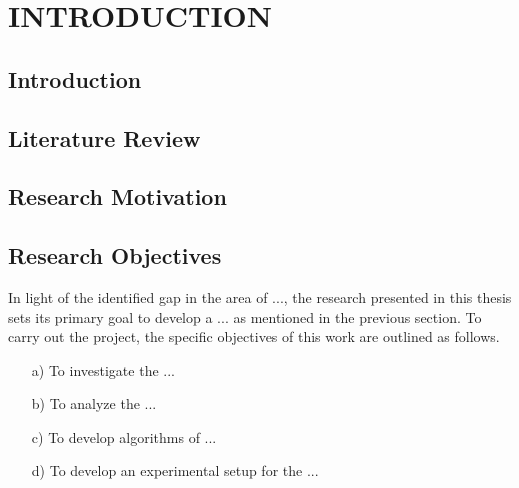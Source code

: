 \chapter{INTRODUCTION}
\label{chap1:intro}



\section{Introduction}
\label{chap1:intro-of-intro}



\section{Literature Review}
\label{sec:literature-review}


\section{Research Motivation}
\label{sec:research-motivation}




\section{Research Objectives}
\label{sec:research-objectives}
In light of the identified gap in the area of ..., the research presented in this thesis sets its primary goal to develop a 
\noindent...  
\noindent as mentioned in the previous section. 
To carry out the project, the specific objectives of this work are outlined as follows. 

\vspace{-0.75em}
\begin{itemize}
	\item[a)] To investigate the ...
	
	\item[b)] To analyze the ...
	
	\item[c)] To develop algorithms of ...
	
	\item[d)] To develop an experimental setup for the ...
\end{itemize}	

